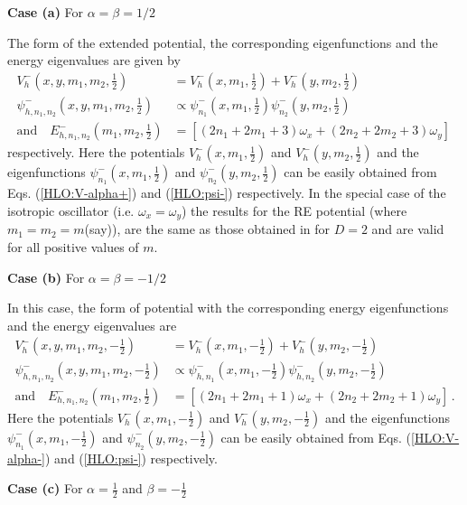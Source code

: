 \documentclass[12pt]{article}
\numberwithin{equation}{section} %
\begin{document}
{\bf Case (a)} For $\alpha=\beta=1/2$
    
The form of the extended potential, the corresponding eigenfunctions and the 
energy eigenvalues are given by 
\begin{align}
V_h^-(x,y,m_1,m_2,\frac{1}{2}) &= V_h^-(x,m_1,\frac{1}{2}) + V_h^-(y,m_2,\frac{1}{2}) \\
\psi_{h,n_1,n_2}^-(x,y,m_1,m_2,\frac{1}{2})&\propto\psi^-_{n_1}(x,m_1,\frac{1}{2})\psi^-_{n_2}(y,m_2,\frac{1}{2})\\
\mbox{and} \quad	
E_{h,n_1,n_2}^-(m_1,m_2,\frac{1}{2})&=\left[\left(2n_1+2m_1+3\right)\omega_x 
+\left(2n_2+2m_2+3\right) \omega_y \right]\,
\end{align}
respectively. Here the potentials $V_h^-(x,m_1,\frac{1}{2})$ and  
$V_h^-(y,m_2,\frac{1}{2})$ and the eigenfunctions 
$\psi^-_{n_1}(x,m_1,\frac{1}{2})$ and $\psi^-_{n_2}(y,m_2,\frac{1}{2})$ can be 
easily obtained from Eqs. (\ref{HLO:V-alpha+}) and (\ref {HLO:psi-}) 
respectively. In the special case of the isotropic oscillator (i.e. $\omega_x =
\omega_y$) the results for the RE potential (where $m_1=m_2=m$(say)), are the 
same as those obtained in \cite{yadava2017rationally} for $D=2$ and are valid 
for all positive values of $m$. 	

{\bf Case (b)}  For \(\alpha = \beta=-1/2\)

In this case, the form of potential with the corresponding energy 
eigenfunctions and the energy eigenvalues are 
\begin{align}
    V_h^-(x,y,m_1,m_2,-\frac{1}{2}) &= V_h^-(x,m_1,-\frac{1}{2}) + V_h^-(y,m_2,-\frac{1}{2}) \\
    \psi_{h,n_1,n_2}^-(x,y,m_1,m_2,-\frac{1}{2})&\propto\psi^-_{h,n_1}(x,m_1,-\frac{1}{2})\psi^-_{h,n_2}(y,m_2,-\frac{1}{2})\\
    \mbox{and} \quad	
E_{h,n_1,n_2}^-(m_1,m_2,\frac{1}{2})&=\left[\left(2n_1+2m_1+1\right)\omega_x
+\left(2n_2+2m_2+1\right) \omega_y \right]\,.
\end{align}
Here the potentials $V_h^-(x,m_1,-\frac{1}{2})$ and  
$V_h^-(y,m_2,-\frac{1}{2})$ and the eigenfunctions 
$\psi^-_{n_1}(x,m_1,-\frac{1}{2})$ and $\psi^-_{n_2}(y,m_2,-\frac{1}{2})$ can 
be easily obtained from Eqs. (\ref{HLO:V-alpha-}) and (\ref {HLO:psi-}) 
respectively. 

{\bf Case (c) }  For $\alpha = \frac{1}{2}$ and $\beta=-\frac{1}{2}$
\end{document}
